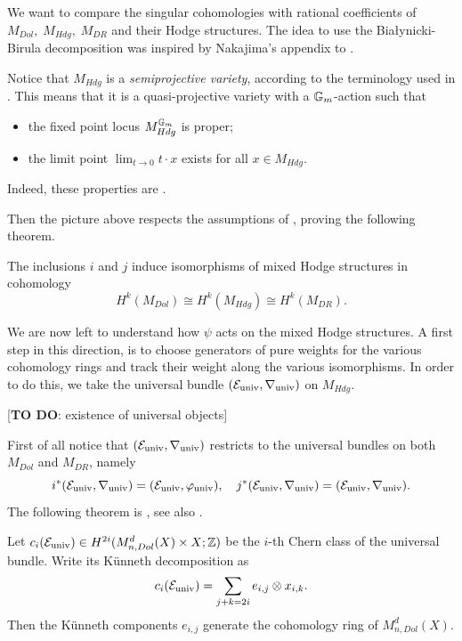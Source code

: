We want to compare the singular cohomologies with rational coefficients of $M_{Dol}, \; M_{Hdg}, \; M_{DR}$ and their Hodge structures. The idea to use the Bia\l{y}nicki-Birula decomposition was inspired by Nakajima's appendix to \cite{appendix-by-nakajima}.

Notice that $M_{Hdg}$ is a \textit{semiprojective variety}, according to the terminology used in \cite{Hausel-RodriguezVillega}. This means that it is a quasi-projective variety with a $\mathbb{G}_m$-action such that
\begin{itemize}
    \item the fixed point locus $M_{Hdg}^{\mathbb{G}_m}$ is proper;
    \item the limit point $\displaystyle \lim_{t \to 0} t \cdot x$ exists for all $x \in M_{Hdg}$.
\end{itemize}
Indeed, these properties are \cite[Lemma 10.4, Corollary 10.3]{Simpson-Hodge-filtration}.

Then the picture above respects the assumptions of \cite[Corollary 1.3.3]{Hausel-RodriguezVillega}, proving the following theorem.

\begin{thm}
The inclusions $i$ and $j$ induce isomorphisms of mixed Hodge structures in cohomology
\[
H^k(M_{Dol}) \cong H^k(M_{Hdg}) \cong H^k(M_{DR}).
\]
\end{thm}

We are now left to understand how $\psi$ acts on the mixed Hodge structures. A first step in this direction, is to choose generators of pure weights for the various cohomology rings and track their weight along the various isomorphisms. In order to do this, we take the universal bundle $(\mathcal{E}_\text{univ}, \nabla_\text{univ})$ on $M_{Hdg}$.

[\textbf{TO DO}: existence of universal objects]

First of all notice that $(\mathcal{E}_\text{univ}, \nabla_\text{univ})$ restricts to the universal bundles on both $M_{Dol}$ and $M_{DR}$, namely
\begin{equation}
i^* (\mathcal{E}_{\text{univ}}, \nabla_{\text{univ}}) = (\mathcal{E}_{\text{univ}}, \varphi_{\text{univ}}), \quad j^*(\mathcal{E}_{\text{univ}}, \nabla_{\text{univ}}) = (\mathcal{E}_{\text{univ}}, \nabla_{\text{univ}}).
\end{equation}
The following theorem is \cite[Theorem 3]{MARKMAN2006}, see also \cites{markman2001}{Tamas-Hausel}.
\begin{thm}
Let $c_i(\mathcal{E}_{\text{univ}}) \in H^{2i}(M_{n, Dol}^d(X) \times X; \mathbb{Z})$ be the $i$-th Chern class of the universal bundle. Write its K\"unneth decomposition as
\begin{equation}
c_i(\mathcal{E}_{\text{univ}}) = \sum_{j+k = 2i} e_{i,j} \otimes x_{i,k}.
\end{equation}
Then the K\"unneth components $e_{i,j}$ generate the cohomology ring of $M_{n, Dol}^d(X)$.
\end{thm}

